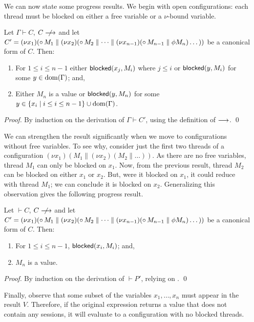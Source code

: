 \documentclass[oribibl,orivec,envcountsame]{llncs}
\begin{document}
We can now state some progress results.  We begin with open configurations: each thread must be
blocked on either a free variable or a $\nu$-bound variable.
%
\begin{theorem}\label{thm:progress-open}
  Let $\Gamma \vdash C$, $C \centernot\ceval$ and let $C' = (\nu x_1)({\mathord{\circ}}\,M_1 \parallel (\nu
  x_2)({\mathord{\circ}}\,M_2 \parallel \dots \parallel (\nu x_{n-1})({\mathord{\circ}}\,M_{n-1} \parallel \phi M_n)\dots))$ be a
  canonical form of $C$.  Then:
  \begin{enumerate}
  \item For $1 \leq i \leq n - 1$ either $\mathsf{blocked}(x_j,M_i)$ where $j \leq i$ or $\mathsf{blocked}(y,M_i)$
    for some $y \in \operatorname{dom}(\Gamma)$; and,
  \item Either $M_n$ is a value or $\mathsf{blocked}(y,M_n)$ for some $y \in \{ x_i \mid i \leq i \leq n -
    1 \} \cup \operatorname{dom}(\Gamma)$.
  \end{enumerate}
\end{theorem}
%
\begin{proof}
  By induction on the derivation of $\Gamma \vdash C'$, using the definition of $\longrightarrow$. \qed
\end{proof}

We can strengthen the result significantly when we move to configurations without free variables.
To see why, consider just the first two threads of a configuration $(\nu x_1)(M_1 \parallel (\nu
x_2)(M_2 \parallel \dots))$.  As there are no free variables, thread $M_1$ can only be blocked on
$x_1$.  Now, from the previous result, thread $M_2$ can be blocked on either $x_1$ or $x_2$.  But,
were it blocked on $x_1$, it could reduce with thread $M_1$; we can conclude it is blocked on $x_2$.
Generalizing this observation gives the following progress result.
%
\begin{corollary}\label{thm:progress}
  Let $\vdash C$, $C \centernot\ceval$ and let $C' = (\nu x_1)({\mathord{\circ}}\,M_1 \parallel (\nu
  x_2)({\mathord{\circ}}\,M_2 \parallel \dots \parallel (\nu x_{n-1})({\mathord{\circ}}\,M_{n-1} \parallel
  \phi M_n)\dots))$ be a canonical form of $C$.  Then:
  \begin{enumerate}
  \item For $1 \leq i \leq n - 1$, $\mathsf{blocked}(x_i,M_i)$; and,
  \item $M_n$ is a value.
  \end{enumerate}
\end{corollary}
%
\begin{proof}
  By induction on the derivation of $\vdash P'$, relying on .  \qed
\end{proof}
%
Finally, observe that some subset of the variables $x_1,\dots,x_n$ must appear in the result $V$.
Therefore, if the original expression returns a value that does not contain any sessions, it will
evaluate to a configuration with no blocked threads.
\end{document}
